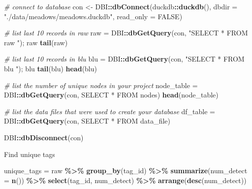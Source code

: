 \documentclass[
]{book}
\newenvironment{Shaded}{\begin{snugshade}}{\end{snugshade}}
\newcommand{\AttributeTok}[1]{\textcolor[rgb]{0.13,0.29,0.53}{#1}}
\newcommand{\CommentTok}[1]{\textcolor[rgb]{0.56,0.35,0.01}{\textit{#1}}}
\newcommand{\ConstantTok}[1]{\textcolor[rgb]{0.56,0.35,0.01}{#1}}
\newcommand{\FunctionTok}[1]{\textcolor[rgb]{0.13,0.29,0.53}{\textbf{#1}}}
\newcommand{\NormalTok}[1]{#1}
\newcommand{\OtherTok}[1]{\textcolor[rgb]{0.56,0.35,0.01}{#1}}
\newcommand{\SpecialCharTok}[1]{\textcolor[rgb]{0.81,0.36,0.00}{\textbf{#1}}}
\newcommand{\StringTok}[1]{\textcolor[rgb]{0.31,0.60,0.02}{#1}}
\begin{document}
\begin{Shaded}
\begin{Highlighting}[]
\CommentTok{\# connect to database}
\NormalTok{con }\OtherTok{\textless{}{-}}\NormalTok{ DBI}\SpecialCharTok{::}\FunctionTok{dbConnect}\NormalTok{(duckdb}\SpecialCharTok{::}\FunctionTok{duckdb}\NormalTok{(), }
                      \AttributeTok{dbdir =} \StringTok{"./data/meadows/meadows.duckdb"}\NormalTok{, }
                      \AttributeTok{read\_only =} \ConstantTok{FALSE}\NormalTok{)}

\CommentTok{\# list last 10 records in raw}
\NormalTok{raw }\OtherTok{=}\NormalTok{ DBI}\SpecialCharTok{::}\FunctionTok{dbGetQuery}\NormalTok{(con, }\StringTok{"SELECT * FROM raw "}\NormalTok{); raw}
\FunctionTok{tail}\NormalTok{(raw)}

\CommentTok{\# list last 10 records in blu}
\NormalTok{blu }\OtherTok{=}\NormalTok{ DBI}\SpecialCharTok{::}\FunctionTok{dbGetQuery}\NormalTok{(con, }\StringTok{"SELECT * FROM blu "}\NormalTok{); blu}
\FunctionTok{tail}\NormalTok{(blu)}
\FunctionTok{head}\NormalTok{(blu)}

\CommentTok{\# list the number of unique nodes in your project}
\NormalTok{node\_table }\OtherTok{=}\NormalTok{ DBI}\SpecialCharTok{::}\FunctionTok{dbGetQuery}\NormalTok{(con, }\StringTok{\textquotesingle{}SELECT * FROM nodes\textquotesingle{}}\NormalTok{)}
\FunctionTok{head}\NormalTok{(node\_table)}

\CommentTok{\# list the data files that were used to create your database}
\NormalTok{df\_table }\OtherTok{=}\NormalTok{ DBI}\SpecialCharTok{::}\FunctionTok{dbGetQuery}\NormalTok{(con, }\StringTok{\textquotesingle{}SELECT * FROM data\_file\textquotesingle{}}\NormalTok{)}

\NormalTok{DBI}\SpecialCharTok{::}\FunctionTok{dbDisconnect}\NormalTok{(con)}
\end{Highlighting}
\end{Shaded}

Find unique tags

\begin{Shaded}
\begin{Highlighting}[]
\NormalTok{unique\_tags }\OtherTok{=}\NormalTok{ raw }\SpecialCharTok{\%\textgreater{}\%}
  \FunctionTok{group\_by}\NormalTok{(tag\_id) }\SpecialCharTok{\%\textgreater{}\%}
  \FunctionTok{summarize}\NormalTok{(}\AttributeTok{num\_detect =} \FunctionTok{n}\NormalTok{()) }\SpecialCharTok{\%\textgreater{}\%}
  \FunctionTok{select}\NormalTok{(tag\_id, num\_detect) }\SpecialCharTok{\%\textgreater{}\%}
  \FunctionTok{arrange}\NormalTok{(}\FunctionTok{desc}\NormalTok{(num\_detect))}
\end{Highlighting}
\end{Shaded}
\end{document}
